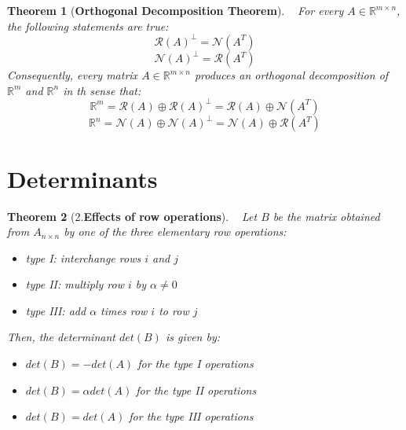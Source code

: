 \documentclass[]{article}
\newtheorem{theo}{Theorem}
\newenvironment{definition}[2][Definition]{\begin{trivlist}
\item[\hskip \labelsep {\bfseries #1}\hskip \labelsep {\bfseries #2.}]}{\end{trivlist}}
\newenvironment{lemma}[2][Lemma]{\begin{trivlist}
\item[\hskip \labelsep {\bfseries #1}\hskip \labelsep {\bfseries #2.}]}{\end{trivlist}}
\begin{document}
\begin{theo}[\textbf{Orthogonal Decomposition Theorem}]
~ For every $A\in \mathbb{R}^{m\times n}$, the following statements are true:
$$\mathcal{R}(A)^{\bot}=\mathcal{N}(A^T)$$
$$\mathcal{N}(A)^{\bot}=\mathcal{R}(A^T)$$
Consequently, every matrix $A\in \mathbb{R}^{m\times n}$ produces an orthogonal decomposition of $\mathbb{R}^m$ and $\mathbb{R}^n$ in th sense that:
$$\mathbb{R}^m=\mathcal{R}(A)\oplus \mathcal{R}(A)^{\bot}=\mathcal{R}(A)\oplus \mathcal{N}(A^T)$$
$$\mathbb{R}^n=\mathcal{N}(A)\oplus \mathcal{N}(A)^{\bot}=\mathcal{N}(A)\oplus \mathcal{R}(A^T)$$
\end{theo}
\pagebreak

\section{Determinants}


\begin{theo}[2.\textbf{Effects of row operations}]
~ Let $B$ be the matrix obtained from $A_{n\times n}$ by one of the three elementary row operations:
\begin{itemize}
\item type I: interchange rows $i$ and $j$
\item type II: multiply row $i$ by $\alpha \neq 0$
\item type III: add $\alpha $ times row $i$ to row $j$
\end{itemize}
Then, the determinant $det(B)$ is given by:
\begin{itemize}
\item $det(B)=-det(A)$ for the type I operations
\item $det(B)=\alpha det(A)$ for the type II operations
\item $det(B)=det(A)$ for the type III operations
\end{itemize}
\end{theo}
\end{document}
